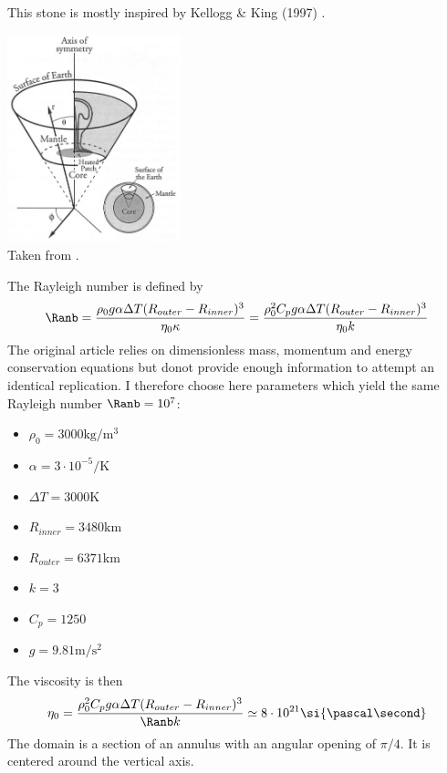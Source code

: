 

This stone is mostly inspired by Kellogg \& King (1997) \cite{keki97}. 

\begin{center}
\includegraphics[width=5cm]{python_codes/fieldstone_106/images/keki97a}\\
{\captionfont Taken from \cite{keki97}.}
\end{center}
The Rayleigh number is defined by
\[
\Ranb 
= \frac{\rho_0 g \alpha \Delta T (R_{outer}-R_{inner})^3}{\eta_0 \kappa}
=\frac{\rho_0^2 C_p g \alpha \Delta T (R_{outer}-R_{inner})^3}{\eta_0 k}
\]
The original article relies on dimensionless mass, momentum and energy conservation equations
but donot provide enough information to attempt an identical replication. I therefore 
choose here parameters which yield the same Rayleigh number $\Ranb=10^7$:
\begin{itemize}
\item $\rho_0=3000\si{\kg\per\cubic\metre}$
\item $\alpha=3\cdot 10^{-5} \si{\per\kelvin}$
\item $\Delta T=3000\si{\kelvin}$
\item $R_{inner}=3480\si{\km}$
\item $R_{outer}=6371\si{\km}$
\item $k=3$
\item $C_p=1250$
\item $g=9.81\si{\metre\per\square\second}$
\end{itemize}
The viscosity is then 
\[
\eta_0
=\frac{\rho_0^2 C_p g \alpha \Delta T (R_{outer}-R_{inner})^3}{\Ranb k}
\simeq 8 \cdot 10^{21}\si{\pascal\second}
\]
The domain is a section of an annulus with an angular opening of $\pi/4$. 
It is centered around the vertical axis. 



